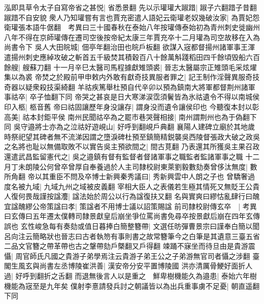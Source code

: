 泓即具草令太子自寫帝省之甚悦|{
	省悉景翻}
先以示瓘瓘大踧踖|{
	踧子六翻踖子昔翻踧踖不自安貌}
衆人乃知瓘嘗有言也賈充密遣人語妃云衛瓘老奴幾破汝家|{
	為賈妃怨衛瓘張本語牛倨翻　考異曰三十國春秋在泰始八年按瓘傳泰始初為青州刺史徙幽州八年不得在京師瓘傳在遷司空後按帝紀太康三年賈充卒十二月瓘為司空故移在入為尚書令下}
吳人大田皖城|{
	佃亭年翻治田也皖戶板翻}
欲謀入宼都督揚州諸軍事王渾遣揚州刺史應綽攻破之斬首五千級焚其積穀百八十餘萬斛踐稻田四千餘頃毁船六百餘艘|{
	艘蘇刀翻}
十一月辛巳太醫司馬程據獻雉頭裘|{
	晉志太醫屬宗正雉頭毛采炫燿集以為裘}
帝焚之於殿前甲申敕内外敢有獻奇技異服者罪之|{
	記王制作淫聲異服奇技奇器以疑衆殺技渠綺翻}
羊祜疾篤舉杜預自代辛卯以預為鎮南大將軍都督荆州諸軍事祜卒|{
	卒子恤翻下同}
帝哭之甚哀是日大寒涕涙霑須鬢皆為氷祜遺令不得以南城侯印入柩|{
	柩音舊}
帝曰祜固讓歷年身没讓存|{
	謂身没而遺令讓侯印也}
今聽復本封以彰高美|{
	祜本封鉅平侯}
南州民聞祜卒為之罷市巷哭聲相接|{
	南州謂荆州也為于偽翻下同}
吳守邉將士亦為之泣祜好遊峴山|{
	好呼到翻峴戶典翻}
襄陽人建碑立廟於其地歲時祭祀望其碑者無不流涕因謂之墮淚碑杜預至鎮簡精鋭襲吳西陵督張政大破之政吳之名將也耻以無備取敗不以實告吳主預欲間之|{
	間古莧翻}
乃表還其所獲吳主果召政還遣武昌監留憲代之|{
	吳之邉鎮有督有監督者督諸軍事之職監者監諸軍事之職}
十二月丁未朗陵公何曾卒曾厚自奉養過於人主司隸校尉東萊劉毅數劾奏曾侈汰無度|{
	數所角翻}
帝以其重臣不問及卒博士新興秦秀議曰|{
	秀新興雲中人朗之子也}
曾驕奢過度名被九域|{
	九域九州之域被皮義翻}
宰相大臣人之表儀若生極其情死又無貶王公貴人復何畏哉謹按諡灋|{
	諡法始於周公以行為諡復扶又翻}
名與實爽曰繆怙亂肆行曰醜宜諡醜繆公帝策諡曰孝|{
	策諡者不用博士議以詔策賜諡}
前司隸校尉傳玄卒　|{
	考異曰玄傳曰五年遷太僕轉司隸景獻皇后崩坐爭位罵尚書免尋卒按景獻后崩在四年玄傳誤也}
玄性峻急每有奏劾或值日暮捧白簡整簪帶|{
	文選任昉彈曹景宗曰謹奉白簡以聞呂向注云簡略狀也晉志曰古者執笏有事則書之故常簪筆今之白筆是其遺意三臺五省二品文官簪之帶革帶也古之鞶帶劾戶槩翻又戶得翻}
竦踊不寐坐而待旦由是貴游震懾|{
	周官師氏凡國之貴游子弟學焉注云貴游子弟王公之子弟游無官司者懾之涉翻}
臺閣生風玄與尚書左丞博陵崔洪善|{
	漢安帝分安平置博陵國}
洪亦清厲骨鯁好面折人過|{
	好呼到翻折之舌翻}
而退無後言人以是重之　鮮卑樹機能久為邉患|{
	泰始六年樹機能為宼至是九年矣}
僕射李憙請發兵討之朝議皆以為出兵重事虜不足憂|{
	朝直遥翻下同}


